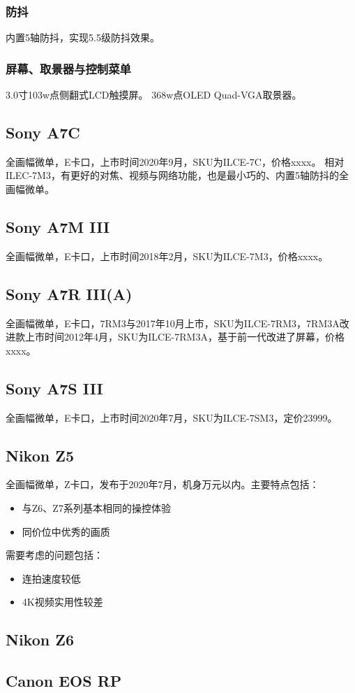 \documentclass{ctexart}
\begin{document}
\subsubsection{防抖}
内置5轴防抖，实现5.5级防抖效果。
\subsubsection{屏幕、取景器与控制菜单}
3.0寸103w点侧翻式LCD触摸屏。
368w点OLED Quad-VGA取景器。


\subsection{Sony A7C}
全画幅微单，E卡口，上市时间2020年9月，SKU为ILCE-7C，价格xxxx。
相对ILEC-7M3，有更好的对焦、视频与网络功能，也是最小巧的、内置5轴防抖的全画幅微单。
\subsection{Sony A7M III}
全画幅微单，E卡口，上市时间2018年2月，SKU为ILCE-7M3，价格xxxx。
\subsection{Sony A7R III(A)}
全画幅微单，E卡口，7RM3与2017年10月上市，SKU为ILCE-7RM3，7RM3A改进款上市时间2012年4月，SKU为ILCE-7RM3A，基于前一代改进了屏幕，价格xxxx。
\subsection{Sony A7S III}
全画幅微单，E卡口，上市时间2020年7月，SKU为ILCE-7SM3，定价23999。

\subsection{Nikon Z5}
全画幅微单，Z卡口，发布于2020年7月，机身万元以内。主要特点包括：
\begin{itemize}
    \item 与Z6、Z7系列基本相同的操控体验
    \item 同价位中优秀的画质
\end{itemize}
需要考虑的问题包括：
\begin{itemize}
    \item 连拍速度较低
    \item 4K视频实用性较差
\end{itemize}
\subsection{Nikon Z6}
\subsection{Canon EOS RP}


\end{document}

